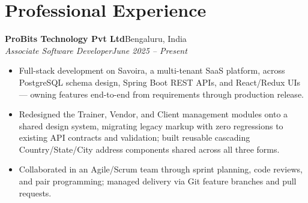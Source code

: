 \documentclass[a4paper,10pt]{article}
\newcommand{\heading}[2]{\textbf{#1}\hfill #2\\[1pt]}
\newcommand{\subheading}[2]{\textit{#1}\hfill \textit{#2}\\[1pt]}
\begin{document}

\section{Professional Experience}

\heading{ProBits Technology Pvt Ltd}{Bengaluru, India}
\subheading{Associate Software Developer}{June 2025 -- Present}
\begin{itemize}
  \item Full-stack development on Savoira, a multi-tenant SaaS platform, across PostgreSQL schema
        design, Spring Boot REST APIs, and React/Redux UIs --- owning features end-to-end from
        requirements through production release.
  \item Redesigned the Trainer, Vendor, and Client management modules onto a shared design system,
        migrating legacy markup with zero regressions to existing API contracts and validation;
        built reusable cascading Country/State/City address components shared across all three forms.
  \item Collaborated in an Agile/Scrum team through sprint planning, code reviews, and pair
        programming; managed delivery via Git feature branches and pull requests.
\end{itemize}
\end{document}
